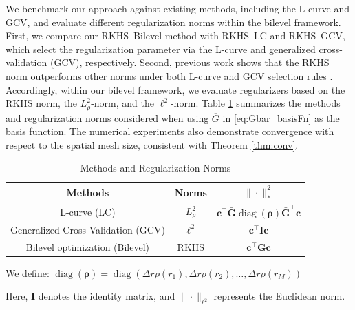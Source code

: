 \documentclass[12pt]{article}
\def\Gbar{ {\overline{G}} }
\numberwithin{equation}{section}
\numberwithin{theorem}{section}
\begin{document}
We benchmark our approach against existing methods, including the L-curve and GCV, and evaluate different regularization norms within the bilevel framework.  First, we compare our RKHS–Bilevel method with RKHS–LC and RKHS–GCV, which select the regularization parameter via the L-curve and generalized cross-validation (GCV), respectively. Second, previous work shows that the RKHS norm outperforms other norms under both L-curve and GCV selection rules \cite{li2025automatic, lu2022data}. Accordingly, within our bilevel framework, we evaluate regularizers based on the RKHS norm, the $L^2_{\rho}$-norm, and the $\ell^2$-norm. Table \ref{tab:method} summarizes the methods and regularization norms considered when using $\Gbar$ in \eqref{eq:Gbar_basisFn} as the basis function. The numerical experiments also demonstrate convergence with respect to the spatial mesh size, consistent with Theorem \ref{thm:conv}.
\begin{table}[H]    
    \centering
    \caption{ Methods and Regularization Norms}
    \begin{threeparttable}
    
    \begin{tabular}{c|cc}
        \toprule
        Methods & Norms &$\|\cdot\|_*^2$  \\
        \midrule
        L-curve (LC) & $L^2_\rho$ &  $\mathbf{c}^{\top}\bar{\mathbf{G}} \operatorname{diag}(\boldsymbol{\rho}) \bar{\mathbf{G}}^{\top}\mathbf{c}$ \tnote{*}\\
  
        Generalized Cross‑Validation (GCV) & $\ell^2$ & $\mathbf{c}^{\top} \mathbf{I} \mathbf{c}$ \tnote{*}\\

        Bilevel optimization (Bilevel) & RKHS  & $\mathbf{c}^{\top}\bar{\mathbf{G}}\mathbf{c}$\\
        \bottomrule
    \end{tabular}
    \vspace{0cm}
     \begin{tablenotes}
        \footnotesize
        \item[*] We define: $\operatorname{diag}(\boldsymbol{\rho})=\operatorname{diag}\left(\Delta r \rho\left(r_1\right), \Delta r \rho\left(r_2\right), \ldots, \Delta r \rho\left(r_M\right)\right)$
        \item[*] Here, $\mathbf{I}$ denotes the identity matrix, and $\|\cdot\|_{\ell^2}$ represents the Euclidean norm.
      \end{tablenotes}
    \end{threeparttable}
      \label{tab:method}
\end{table}
\end{document}
